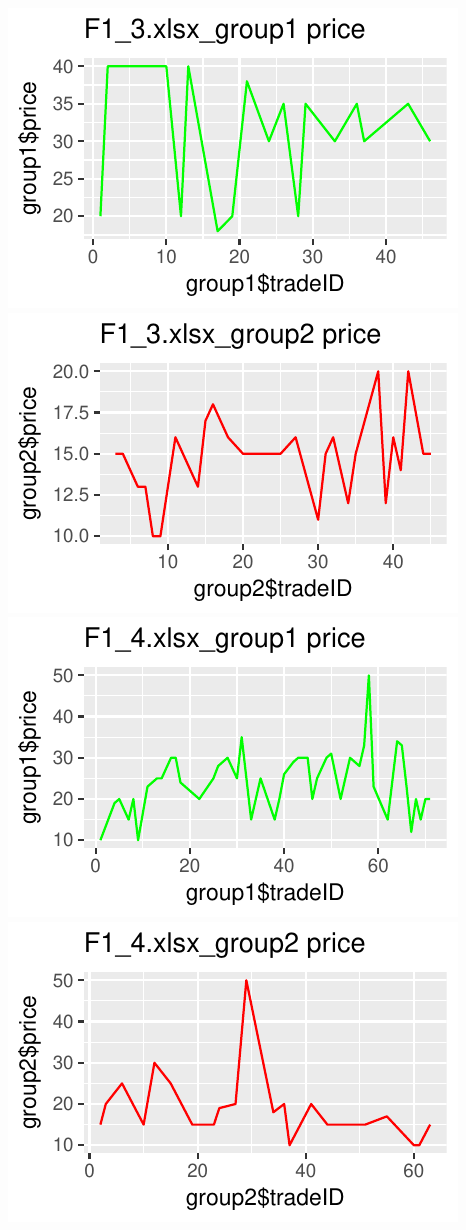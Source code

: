 \documentclass[]{article}
\begin{document}
\includegraphics{finance_homework_files/figure-latex/unnamed-chunk-3-5.pdf}
\includegraphics{finance_homework_files/figure-latex/unnamed-chunk-3-6.pdf}
\includegraphics{finance_homework_files/figure-latex/unnamed-chunk-3-7.pdf}
\includegraphics{finance_homework_files/figure-latex/unnamed-chunk-3-8.pdf}
\end{document}
